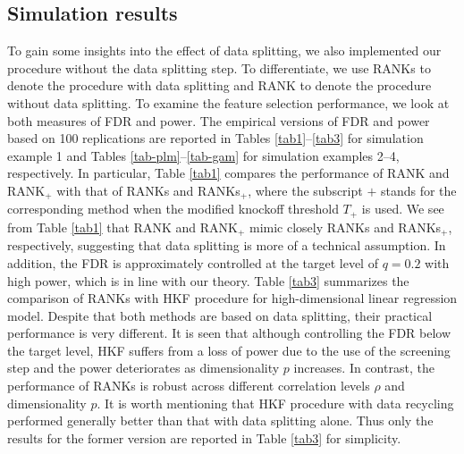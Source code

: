\documentclass[11pt]{article}
\newcommand{\by}{\mbox{\bf y}}
\newcommand{\bX}{\mbox{\bf X}}
\newcommand{\bOmg}{\mbox{\boldmath $\Omega$}}
\newcommand{\wt}{\widetilde}
\newcommand{\wh}{\widehat}
\begin{document}
\subsection{Simulation results} \label{sec4.3}
To gain some insights into the effect of data splitting, we also implemented our procedure without the data splitting step.
To differentiate, we use RANKs to denote the procedure with data splitting and RANK to denote the procedure without data splitting. To examine the feature selection performance, we look at both measures of FDR and power. The empirical versions of FDR and power based on 100 replications are reported in Tables \ref{tab1}--\ref{tab3} for simulation example 1 and Tables \ref{tab-plm}--\ref{tab-gam} for simulation examples 2--4, respectively. In particular, Table \ref{tab1} compares the performance of RANK and RANK$_+$ with that of RANKs and RANKs$_+$, where the subscript $+$ stands for the corresponding method when the modified knockoff threshold $T_+$ is used.   %
We see from Table \ref{tab1} that RANK and RANK$_+$ mimic closely RANKs and RANKs$_+$, respectively, suggesting that data splitting is more of a technical assumption.  In addition, the FDR is approximately controlled at the target level of $q = 0.2$ with high power, which is in line with our theory. Table \ref{tab3} summarizes the comparison of RANKs with HKF procedure for high-dimensional linear regression model. Despite that both methods are based on data splitting, their practical performance is very different.  It is seen that although controlling the FDR below the target level, HKF suffers from a loss of power due to the use of the screening step and the power deteriorates as dimensionality $p$ increases. In contrast, the performance of RANKs is robust across different correlation levels $\rho$ and dimensionality $p$. It is worth mentioning that HKF procedure with data recycling performed generally better than that with data splitting alone. Thus only the results for the former version are reported in Table \ref{tab3} for simplicity.
\end{document}
